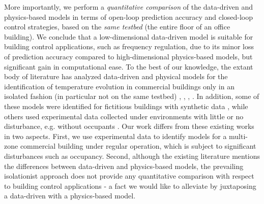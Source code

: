 More importantly, we perform a \textit{quantitative comparison} of the data-driven and physics-based models in terms of open-loop prediction accuracy and closed-loop control strategies, based on the \textit{same testbed} (the entire floor of an office building). %
We conclude that a low-dimensional data-driven model is suitable for building control applications, such as frequency regulation, due to its minor loss of prediction accuracy compared to high-dimensional physics-based models, but significant gain in computational ease. 
To the best of our knowledge, the extant body of literature has analyzed data-driven and physical models for the identification of temperature evolution in commercial buildings only in an isolated fashion (in particular not on the same testbed) \cite{Ma:2011aa}, \cite{Siroky:2011aa}, \cite{Lin:2015exp}, \cite{Qie}. In addition, some of these models were identified for fictitious buildings with synthetic data \cite{Cole:2013aa, Goyal:2013occupancy, David}, while others used experimental data collected under environments with little or no disturbance, e.g. without occupants \cite{Lin:2015exp}. Our work differs from these existing works in two aspects. First, we use experimental data to identify models for a multi-zone commercial building under regular operation, which is subject to significant disturbances such as occupancy. Second, although the existing literature mentions the differences between data-driven and physics-based models, the prevailing isolationist approach does not provide any quantitative comparison with respect to building control applications - a fact we would like to alleviate by juxtaposing a data-driven with a physics-based model.



